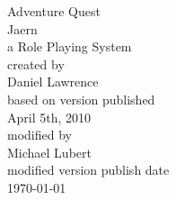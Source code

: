 \begin{titlepage}
\begin{center}
\huge Adventure Quest\\
Jaern\\
\vspace*{1cm}
\normalsize a Role Playing System\\
\vspace*{1cm}
created by\\
Daniel Lawrence\\
\vspace*{1cm}
based on version published\\
April 5th, 2010\\
\vspace*{1cm}
modified by\\
Michael Lubert\\
\vspace*{1cm}
modified version publish date\\
\today
\end{center}
\end{titlepage}